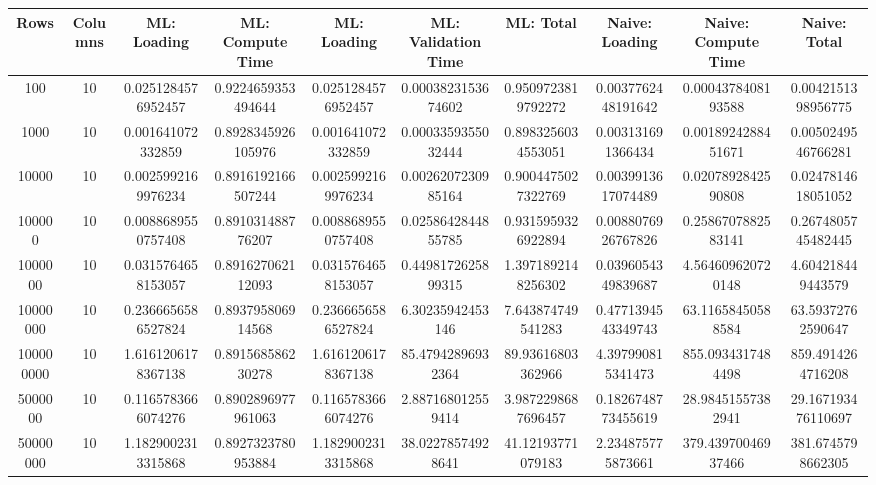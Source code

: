 \begin{table}[htb]
    \centering
    \begin{tabular}{@{}cccccccccc@{}}
        \toprule
        Rows & Columns & ML: Loading & ML: Compute Time & ML: Loading & ML: Validation Time & ML: Total & Naive: Loading & Naive: Compute Time & Naive: Total \\
        \midrule
        100 & 10 & 0.0251284576952457 & 0.9224659353494644 & 0.0251284576952457 & 0.0003823153674602 & 0.9509723819792272 & 0.0037762448191642 & 0.0004378408193588 & 0.0042151398956775 \\
        1000 & 10 & 0.001641072332859 & 0.8928345926105976 & 0.001641072332859 & 0.0003359355032444 & 0.8983256034553051 & 0.003131691366434 & 0.0018924288451671 & 0.0050249546766281 \\
        10000 & 10 & 0.0025992169976234 & 0.8916192166507244 & 0.0025992169976234 & 0.0026207230985164 & 0.9004475027322769 & 0.0039913617074489 & 0.0207892842590808 & 0.0247814618051052 \\
        100000 & 10 & 0.0088689550757408 & 0.891031488776207 & 0.0088689550757408 & 0.0258642844855785 & 0.9315959326922894 & 0.0088076926767826 & 0.2586707882583141 & 0.2674805745482445 \\
        1000000 & 10 & 0.0315764658153057 & 0.891627062112093 & 0.0315764658153057 & 0.4498172625899315 & 1.3971892148256302 & 0.0396054349839687 & 4.564609620720148 & 4.604218449443579 \\
        10000000 & 10 & 0.2366656586527824 & 0.893795806914568 & 0.2366656586527824 & 6.30235942453146 & 7.643874749541283 & 0.4771394543349743 & 63.11658450588584 & 63.59372762590647 \\
        100000000 & 10 & 1.6161206178367138 & 0.891568586230278 & 1.6161206178367138 & 85.47942896932364 & 89.93616803362966 & 4.397990815341473 & 855.0934317484498 & 859.4914264716208 \\
        5000000 & 10 & 0.1165783666074276 & 0.8902896977961063 & 0.1165783666074276 & 2.887168012559414 & 3.9872298687696457 & 0.1826748773455619 & 28.98451557382941 & 29.167193476110697 \\
        50000000 & 10 & 1.1829002313315868 & 0.8927323780953884 & 1.1829002313315868 & 38.02278574928641 & 41.12193771079183 & 2.234875775873661 & 379.43970046937466 & 381.6745798662305 \\
        \bottomrule
    \end{tabular}
\end{table}